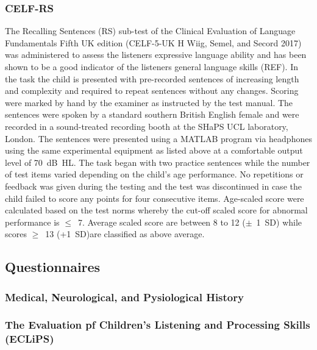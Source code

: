 \documentclass[a4paper,nobind]{templates/ociamthesis}
\begin{document}
\hypertarget{celf-rs}{%
\subsubsection{CELF-RS}\label{celf-rs}}

The Recalling Sentences (RS) sub-test of the Clinical Evaluation of
Language Fundamentals Fifth UK edition (CELF-5-UK H Wiig, Semel, and
Secord 2017) was administered to assess the listeners expressive
language ability and has been shown to be a good indicator of the
listeners general language skills (REF). In the task the child is
presented with pre-recorded sentences of increasing length and
complexity and required to repeat sentences without any changes. Scoring
were marked by hand by the examiner as instructed by the test manual.
The sentences were spoken by a standard southern British English female
and were recorded in a sound-treated recording booth at the SHaPS UCL
laboratory, London. The sentences were presented using a MATLAB program
via headphones using the same experimental equipment as listed above at
a comfortable output level of 70~dB~HL. The task began with two practice
sentences while the number of test items varied depending on the child's
age performance. No repetitions or feedback was given during the testing
and the test was discontinued in case the child failed to score any
points for four consecutive items. Age-scaled score were calculated
based on the test norms whereby the cut-off scaled score for abnormal
performance is \(\leq\)~7. Average scaled score are between 8 to 12
(\(\pm\)~1~SD) while scores \(\geq\)~13 (+1~SD)are classified as above
average.

\hypertarget{questionnaires}{%
\subsection{Questionnaires}\label{questionnaires}}

\hypertarget{medical-neurological-and-pysiological-history}{%
\subsubsection*{Medical, Neurological, and Pysiological
History}\label{medical-neurological-and-pysiological-history}}

\hypertarget{the-evaluation-pf-childrens-listening-and-processing-skills-eclips}{%
\subsubsection*{The Evaluation pf Children's Listening and Processing
Skills
(ECLiPS)}\label{the-evaluation-pf-childrens-listening-and-processing-skills-eclips}}
\end{document}
